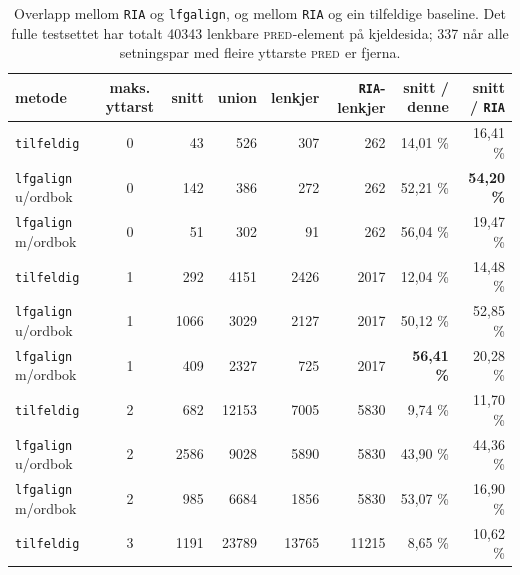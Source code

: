 \documentclass[12pt,a4paper,oneside,draft]{report}
\newcommand{\F}[2]{\textsc{#1}\ensuremath{_{#2}}}
\newcommand{\PRED}{\F{pred}{}}
\begin{document}
\begin{table}[htb]
\caption{\label{tbl:RIA}Overlapp mellom \texttt{RIA} og \texttt{lfgalign}, og mellom \texttt{RIA} og ein tilfeldige baseline. Det fulle testsettet har totalt 40343 lenkbare \PRED{}-element på kjeldesida; 337 når alle setningspar med fleire yttarste \PRED{} er fjerna.}
\begin{center}
\begin{tabular}{lcrrrrrr}
 metode                      &  maks. yttarst  &  snitt  &  union  &  lenkjer  &  \texttt{RIA}-lenkjer  &  snitt / denne      &  snitt / \texttt{RIA}  \\
\hline
 \texttt{tilfeldig}          &              0  &     43  &    526  &      307  &                   262  &  14,01 \%           &  16,41 \%              \\
 \texttt{lfgalign} u/ordbok  &              0  &    142  &    386  &      272  &                   262  &  52,21 \%           &  \textbf{54,20 \%}     \\
 \texttt{lfgalign} m/ordbok  &              0  &     51  &    302  &       91  &                   262  &  56,04 \%           &  19,47 \%              \\
\hline
 \texttt{tilfeldig}          &              1  &    292  &   4151  &     2426  &                  2017  &  12,04 \%           &  14,48 \%              \\
 \texttt{lfgalign} u/ordbok  &              1  &   1066  &   3029  &     2127  &                  2017  &  50,12 \%           &  52,85 \%              \\
 \texttt{lfgalign} m/ordbok  &              1  &    409  &   2327  &      725  &                  2017  &  \textbf{56,41 \%}  &  20,28 \%              \\
\hline
 \texttt{tilfeldig}          &              2  &    682  &  12153  &     7005  &                  5830  &  9,74 \%            &  11,70 \%              \\
 \texttt{lfgalign} u/ordbok  &              2  &   2586  &   9028  &     5890  &                  5830  &  43,90 \%           &  44,36 \%              \\
 \texttt{lfgalign} m/ordbok  &              2  &    985  &   6684  &     1856  &                  5830  &  53,07 \%           &  16,90 \%              \\
\hline
 \texttt{tilfeldig}          &              3  &   1191  &  23789  &    13765  &                 11215  &  8,65 \%            &  10,62 \%              \\

\end{tabular}
\end{center}
\end{table}
\end{document}

